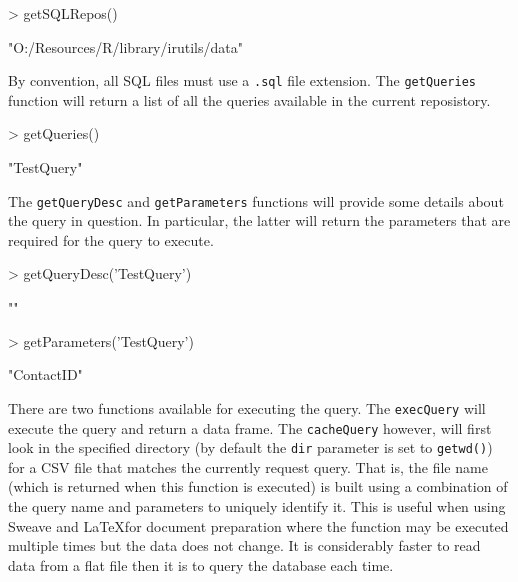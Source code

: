 \documentclass[letterpaper,11pt]{article}
\begin{document}
\begin{Schunk}
\begin{Sinput}
> getSQLRepos()
\end{Sinput}
\begin{Soutput}
[1] "O:/Resources/R/library/irutils/data"
\end{Soutput}
\end{Schunk}

By convention, all SQL files must use a \texttt{.sql} file extension. The \texttt{getQueries} function will return a list of all the queries available in the current reposistory.

\begin{Schunk}
\begin{Sinput}
> getQueries()
\end{Sinput}
\begin{Soutput}
[1] "TestQuery"
\end{Soutput}
\end{Schunk}

The \texttt{getQueryDesc} and \texttt{getParameters} functions will provide some details about the query in question. In particular, the latter will return the parameters that are required for the query to execute.

\begin{Schunk}
\begin{Sinput}
> getQueryDesc('TestQuery')
\end{Sinput}
\begin{Soutput}
[1] ""
\end{Soutput}
\begin{Sinput}
> getParameters('TestQuery')
\end{Sinput}
\begin{Soutput}
[1] "ContactID"
\end{Soutput}
\end{Schunk}

There are two functions available for executing the query. The \texttt{execQuery} will execute the query and return a data frame. The \texttt{cacheQuery} however, will first look in the specified directory (by default the \texttt{dir} parameter is set to \texttt{getwd()}) for a CSV file that matches the currently request query. That is, the file name (which is returned when this function is executed) is built using a combination of the query name and parameters to uniquely identify it. This is useful when using Sweave and \LaTeX for document preparation where the function may be executed multiple times but the data does not change. It is considerably faster to read data from a flat file then it is to query the database each time.
\end{document}

